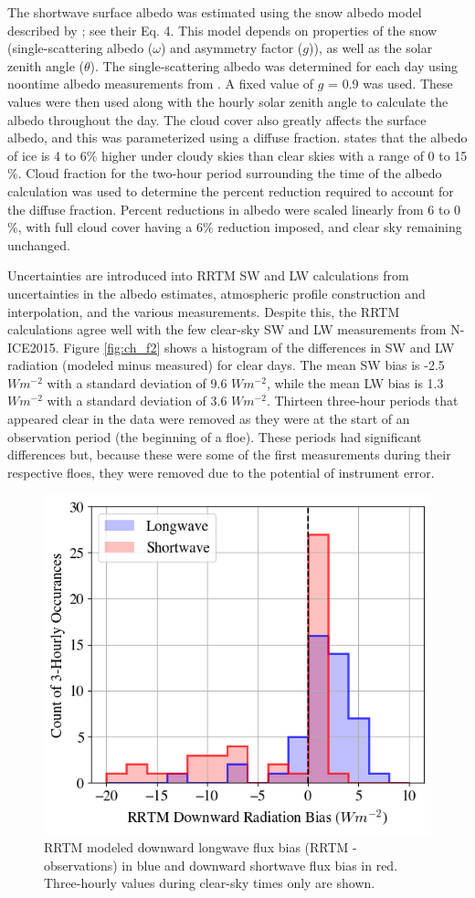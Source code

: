 The shortwave surface albedo was estimated using the snow albedo model described by \citet{wiscombe:1980}; see their Eq. 4. This model depends on properties of the snow (single-scattering albedo ($\omega$) and asymmetry factor ($g$)), as well as the solar zenith angle ($\theta$). The single-scattering albedo was determined for each day using noontime albedo measurements from \citet{walden:2017}. A fixed value of $g$ = 0.9 was used. These values were then used along with the hourly solar zenith angle to calculate the albedo throughout the day. The cloud cover also greatly affects the surface albedo, and this was parameterized using a diffuse fraction. \citet{key:2001} states that the albedo of ice is 4 to 6$\%$ higher under cloudy skies than clear skies with a range of 0 to 15$\%$. Cloud fraction for the two-hour period surrounding the time of the albedo calculation was used to determine the percent reduction required to account for the diffuse fraction. Percent reductions in albedo were scaled linearly from 6 to 0$\%$, with full cloud cover having a 6$\%$ reduction imposed, and clear sky remaining unchanged.

Uncertainties are introduced into RRTM SW and LW calculations from uncertainties in the albedo estimates, atmospheric profile construction and interpolation, and the various measurements. Despite this, the RRTM calculations agree well with the few clear-sky SW and LW measurements from N-ICE2015. Figure \ref{fig:ch_f2} shows a histogram of the differences in SW and LW radiation (modeled minus measured) for clear days. The mean SW bias is -2.5 $W m^{-2}$ with a standard deviation of 9.6 $W m^{-2}$, while the mean LW bias is 1.3 $W m^{-2}$ with a standard deviation of 3.6 $W m^{-2}$. Thirteen three-hour periods that appeared clear in the data were removed as they were at the start of an observation period (the beginning of a floe). These periods had significant differences but, because these were some of the first measurements during their respective floes, they were removed due to the potential of instrument error.

\begin{figure}[h]
    \centering
    \includegraphics[width=0.65\linewidth]{figures/chapter4/RRTMcorrelation_bias.png}
    \caption[RRTM modeled downward flux bias histogram.]{RRTM modeled downward longwave flux bias (RRTM - observations) in blue and downward shortwave flux bias in red. Three-hourly values during clear-sky times only are shown.}
    \label{fig:rrtm}
\end{figure}

